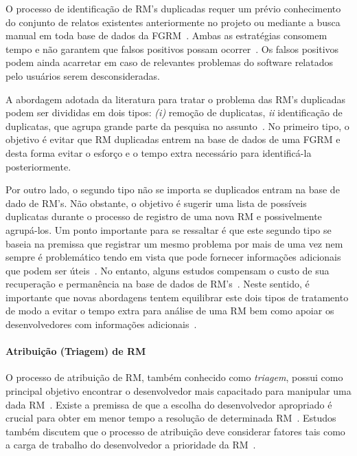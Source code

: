O processo de identificação de RM's duplicadas requer um prévio conhecimento do
conjunto de relatos existentes anteriormente no projeto ou mediante a busca
manual em toda base de dados da FGRM~\cite{banerjee2012automated,
	Lerch:2013:FDY:2495256.2495763,hindle2016contextual}. Ambas as estratégias
consomem tempo e não garantem que falsos positivos possam
ocorrer~\cite{kaushik2012comparative}. Os falsos positivos podem ainda acarretar
em caso de relevantes problemas do software relatados pelo usuários serem
desconsideradas.

A abordagem adotada da literatura para tratar o problema das RM's duplicadas
podem ser divididas em dois tipos\cite{kaushik2012comparative,
	tian2012improved}: \textit{(i)} remoção de duplicatas, \textit{ii}
identificação de duplicatas, que agrupa grande parte da pesquisa no
assunto~\cite{cavalcanti2014challenges}. No primeiro tipo, o objetivo é evitar
que RM duplicadas entrem na base de dados de uma FGRM e desta forma evitar o
esforço e o tempo extra necessário para identificá-la posteriormente.

Por outro lado, o segundo tipo não se importa se duplicados entram na base de
dado de RM's. Não obstante, o objetivo é sugerir uma lista de possíveis
duplicatas durante o processo de registro de uma nova RM e possivelmente
agrupá-los. Um ponto importante para se ressaltar é que este segundo tipo se
baseia na premissa que registrar um mesmo problema por mais de uma vez nem
sempre é problemático tendo em vista que pode fornecer informações adicionais
que podem ser úteis~\cite{bettenburg2008duplicate}. No entanto, alguns estudos
compensam o custo de sua recuperação e permanência na base de dados de
RM's~\cite{davidson2011coping}. Neste sentido, é importante que novas abordagens
tentem equilibrar este dois tipos de tratamento de modo a evitar o tempo extra
para análise de uma RM bem como apoiar os desenvolvedores com informações
adicionais~\cite{Lerch:2013:FDY:2495256.2495763,Thung2014}.

\paragraph{Atribuição (Triagem) de RM} O processo de atribuição de RM, também
conhecido como \textit{triagem}, possui como principal objetivo encontrar o
desenvolvedor mais capacitado para manipular uma dada
RM~\cite{cavalcanti2014challenges}. Existe a premissa de que a escolha do
desenvolvedor apropriado é crucial para obter em menor tempo a re\-so\-lu\-ção
de determinada RM~\cite{di2002approach}. Estudos também discutem que o processo
de atribuição deve considerar fatores tais como a carga de trabalho do
desenvolvedor a prioridade da RM~\cite{aljarah2011selecting}.

